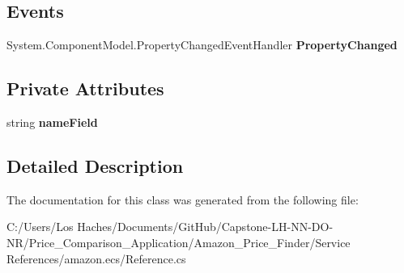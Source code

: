 \subsection*{Events}
\begin{DoxyCompactItemize}
\item 
\hypertarget{class_price___comparison_1_1amazon_1_1ecs_1_1_merchant_a8bc3dd9c6e6ae42ac1e08aac18224a2a}{System.\-Component\-Model.\-Property\-Changed\-Event\-Handler {\bfseries Property\-Changed}}\label{class_price___comparison_1_1amazon_1_1ecs_1_1_merchant_a8bc3dd9c6e6ae42ac1e08aac18224a2a}

\end{DoxyCompactItemize}
\subsection*{Private Attributes}
\begin{DoxyCompactItemize}
\item 
\hypertarget{class_price___comparison_1_1amazon_1_1ecs_1_1_merchant_a2697f3775161e7eba564156352cd77f7}{string {\bfseries name\-Field}}\label{class_price___comparison_1_1amazon_1_1ecs_1_1_merchant_a2697f3775161e7eba564156352cd77f7}

\end{DoxyCompactItemize}


\subsection{Detailed Description}


The documentation for this class was generated from the following file\-:\begin{DoxyCompactItemize}
\item 
C\-:/\-Users/\-Los Haches/\-Documents/\-Git\-Hub/\-Capstone-\/\-L\-H-\/\-N\-N-\/\-D\-O-\/\-N\-R/\-Price\-\_\-\-Comparison\-\_\-\-Application/\-Amazon\-\_\-\-Price\-\_\-\-Finder/\-Service References/amazon.\-ecs/Reference.\-cs\end{DoxyCompactItemize}
